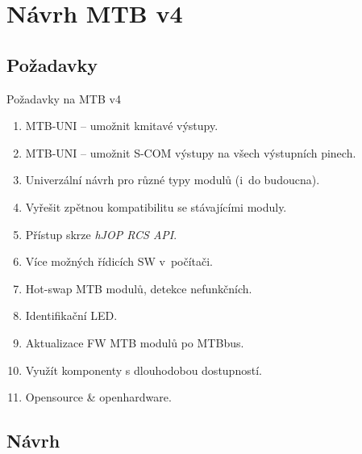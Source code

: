 \documentclass[aspectratio=169]{beamer}
\begin{document}

\section{Návrh MTB v4}
\subsection{Požadavky}

\begin{frame}{Požadavky na MTB v4}
\begin{enumerate}
\item MTB-UNI – umožnit kmitavé výstupy.
\item MTB-UNI – umožnit S-COM výstupy na všech výstupních pinech.
\item Univerzální návrh pro různé typy modulů (i do budoucna).
\item Vyřešit zpětnou kompatibilitu se stávajícími moduly.
\item Přístup skrze \textit{hJOP RCS API}.
\item Více možných řídicích SW v počítači.
\item Hot-swap MTB modulů, detekce nefunkčních.
\item Identifikační LED.
\item Aktualizace FW MTB modulů po MTBbus.
\item Využít komponenty s dlouhodobou dostupností.
\item Opensource \& openhardware.
\end{enumerate}
\end{frame}


\subsection{Návrh}
\end{document}
